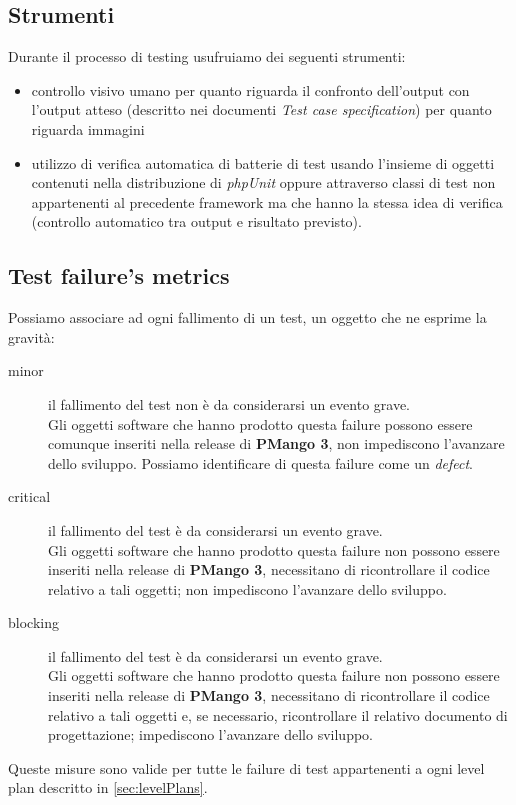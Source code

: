 \subsection{Strumenti}
\label{subsec:testingTools}
Durante il processo di testing usufruiamo dei seguenti strumenti:
\begin{itemize}
  \item controllo visivo umano per quanto riguarda il confronto dell'output
  con l'output atteso (descritto nei documenti \emph{Test case specification})
  per quanto riguarda immagini
  \item utilizzo di verifica automatica di batterie di test usando l'insieme di
  oggetti contenuti nella distribuzione di \emph{phpUnit} oppure attraverso
  classi di test non appartenenti al precedente framework ma che hanno la
  stessa idea di verifica (controllo automatico tra output e risultato
  previsto).
\end{itemize}

\subsection{Test failure's metrics}
Possiamo associare ad ogni fallimento di un test, un oggetto che ne esprime la
gravit\`a:
\begin{description}
  \item[minor] il fallimento del test non \`e da considerarsi un evento grave.\\
  Gli oggetti software che hanno prodotto questa failure possono essere comunque
  inseriti nella release di \textbf{PMango 3}, non impediscono l'avanzare dello
  sviluppo. Possiamo identificare di questa failure come un \emph{defect}.
  \item[critical] il fallimento del test \`e da considerarsi un evento grave.\\
  Gli oggetti software che hanno prodotto questa failure non possono essere
  inseriti nella release di \textbf{PMango 3}, necessitano di ricontrollare il
  codice relativo a tali oggetti; non impediscono l'avanzare dello sviluppo.
  \item[blocking] il fallimento del test \`e da considerarsi un evento grave.\\
  Gli oggetti software che hanno prodotto questa failure non possono essere
  inseriti nella release di \textbf{PMango 3}, necessitano di ricontrollare il
  codice relativo a tali oggetti e, se necessario, ricontrollare il relativo
  documento di progettazione; impediscono l'avanzare dello sviluppo.
\end{description}
Queste misure sono valide per tutte le failure di test appartenenti a ogni
level plan descritto in \ref{sec:levelPlans}.


